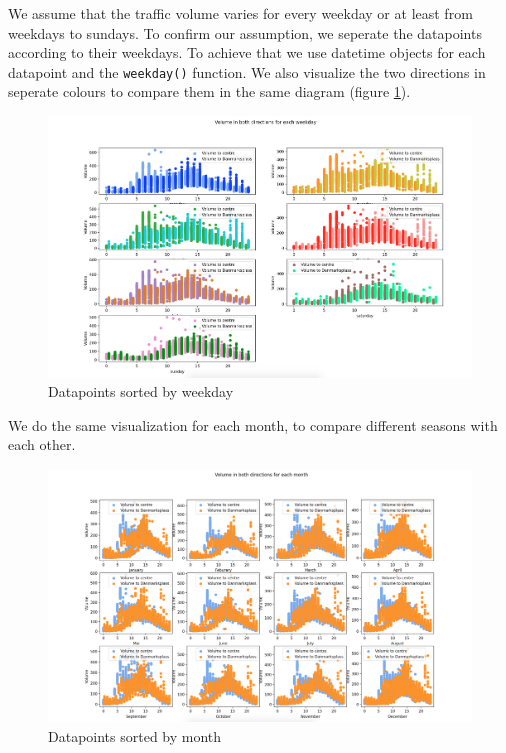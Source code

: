 \documentclass[12pt,a4paper]{scrartcl}		%
\begin{document}
We assume that the traffic volume varies for every weekday or at least from weekdays to sundays. To confirm our assumption, we seperate 
the datapoints according to their weekdays. To achieve that we use datetime objects for each datapoint and the \texttt{weekday()} function.
We also visualize the two directions in seperate colours to compare them in the same diagram (figure \ref{fig::days}).
\begin{figure}[h]
    \centering
    \includegraphics[scale = 0.29]{vis_days.png}
    \caption{Datapoints sorted by weekday}
    \label{fig::days}
\end{figure}

We do the same visualization for each month, to compare different seasons with each other.

\begin{figure}[h]
    \centering
    \includegraphics[scale = 0.28]{vis_months.png}
    \caption{Datapoints sorted by month}
    \label{fig::month}
\end{figure}
\end{document}
